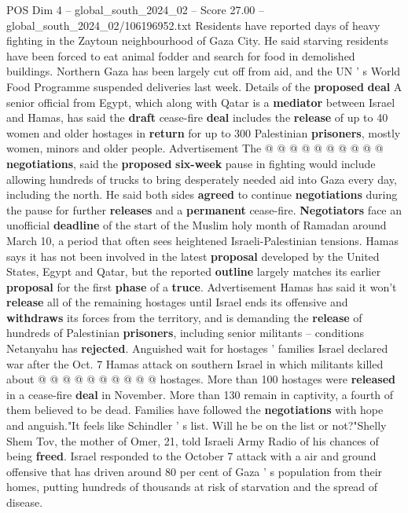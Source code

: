\begin{textsample}{POS Dim 4 – global\_south\_2024\_02 – Score 27.00 – global\_south\_2024\_02/106196952.txt}
Residents have reported days of heavy fighting in the Zaytoun neighbourhood of Gaza City.
He said starving residents have been forced to eat animal fodder and search for food in demolished buildings.
Northern Gaza has been largely cut off from aid, and the UN ' s World Food Programme suspended deliveries last week.
Details of the \textbf{proposed} \textbf{deal} A senior official from Egypt, which along with Qatar is a \textbf{mediator} between Israel and Hamas, has said the \textbf{draft} cease-fire \textbf{deal} includes the \textbf{release} of up to 40 women and older hostages in \textbf{return} for up to 300 Palestinian \textbf{prisoners}, mostly women, minors and older people.
Advertisement The @ @ @ @ @ @ @ @ @ @ \textbf{negotiations}, said the \textbf{proposed} \textbf{six-week} pause in fighting would include allowing hundreds of trucks to bring desperately needed aid into Gaza every day, including the north.
He said both sides \textbf{agreed} to continue \textbf{negotiations} during the pause for further \textbf{releases} and a \textbf{permanent} cease-fire. \textbf{Negotiators} face an unofficial \textbf{deadline} of the start of the Muslim holy month of Ramadan around March 10, a period that often sees heightened Israeli-Palestinian tensions.
Hamas says it has not been involved in the latest \textbf{proposal} developed by the United States, Egypt and Qatar, but the reported \textbf{outline} largely matches its earlier \textbf{proposal} for the first \textbf{phase} of a \textbf{truce}.
Advertisement Hamas has said it won't \textbf{release} all of the remaining hostages until Israel ends its offensive and \textbf{withdraws} its forces from the territory, and is demanding the \textbf{release} of hundreds of Palestinian \textbf{prisoners}, including senior militants -- conditions Netanyahu has \textbf{rejected}.
Anguished wait for hostages ' families Israel declared war after the Oct. 7 Hamas attack on southern Israel in which militants killed about @ @ @ @ @ @ @ @ @ @ hostages.
More than 100 hostages were \textbf{released} in a cease-fire \textbf{deal} in November.
More than 130 remain in captivity, a fourth of them believed to be dead.
Families have followed the \textbf{negotiations} with hope and anguish."It feels like Schindler ' s list.
Will he be on the list or not?"Shelly Shem Tov, the mother of Omer, 21, told Israeli Army Radio of his chances of being \textbf{freed}.
Israel responded to the October 7 attack with a air and ground offensive that has driven around 80 per cent of Gaza ' s population from their homes, putting hundreds of thousands at risk of starvation and the spread of disease.

\end{textsample}
